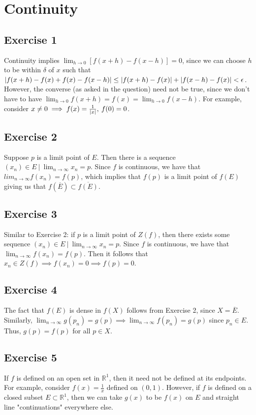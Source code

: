 \section{Continuity}

\subsection{Exercise 1}
Continuity implies $\lim_{h \to 0} [f(x + h) - f(x - h)] = 0$, since we can choose $h$ to be within
$\delta$ of $x$ such that $\abs{f(x + h) - f(x) + f(x) - f(x - h)} \leq \abs{f(x + h) - f(x)}
+ \abs{f(x - h) - f(x)} < \epsilon$. However, the converse (as asked in the question) need not be
true, since we don't have to have $\lim_{h \to 0} f(x + h) = f(x) = \lim_{h \to 0} f(x - h)$.
For example, consider $x \neq 0 \implies f(x) = \frac{1}{\abs{x}}, \: f(0) = 0$. 

\subsection{Exercise 2}
Suppose $p$ is a limit point of $E$. Then there is a sequence $(x_n) \in E \: | \: \lim_{n \to \infty} x_n = p$.
Since $f$ is continuous, we have that $lim_{n \to \infty} f(x_n) = f(p)$, which implies that $f(p)$ is
a limit point of $f(E)$ giving us that $f(\overline{E}) \subset  \overline{f(E)}$.

\subsection{Exercise 3}
Similar to Exercise 2: if $p$ is a limit point of $Z(f)$, then there exists some sequence $(x_n) \in E \: | \: 
\lim_{n \to \infty} x_n = p$. Since $f$ is continuous, we have that $\lim_{n \to  \infty} f(x_n) = f(p)$. 
Then it follows that $x_n \in Z(f) \implies f(x_n) = 0 \implies f(p) = 0$.

\subsection{Exercise 4}
The fact that $f(E)$ is dense in $f(X)$ follows from Exercise 2, since $X = \overline{E}$.
Similarly, $\lim_{n \to \infty} g(p_n) = g(p) \implies \lim_{n \to \infty} f(p_n) = g(p)$ 
since $p_n \in E$. Thus, $g(p) = f(p)$ for all $p \in X$.

\subsection{Exercise 5}
If $f$ is defined on an open set in $\mathbb{R}^1$, then it need not be defined at its endpoints.
For example, consider $f(x) = \frac{1}{x}$ defined on $(0, 1)$. However, if $f$ is defined on a
closed subset $E \subset \mathbb{R}^1$, then we can take $g(x)$ to be $f(x)$ on $E$ and straight
line "continuations" everywhere else.
